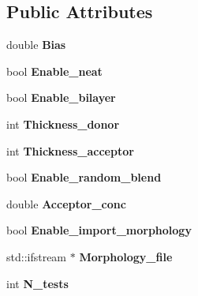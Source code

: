 \subsection*{Public Attributes}
\begin{DoxyCompactItemize}
\item 
\mbox{\label{struct_parameters___o_p_v_ac88bf3fcfbd5dbd502a05709e47d6540}} 
double {\bfseries Bias}
\item 
\mbox{\label{struct_parameters___o_p_v_ab935c4ae52bebea687d925e997fc8218}} 
bool {\bfseries Enable\+\_\+neat}
\item 
\mbox{\label{struct_parameters___o_p_v_a79f3ca42bb1073fac803ff8e74faabc0}} 
bool {\bfseries Enable\+\_\+bilayer}
\item 
\mbox{\label{struct_parameters___o_p_v_a4c49f81e20e235e52f943003f0c14fa3}} 
int {\bfseries Thickness\+\_\+donor}
\item 
\mbox{\label{struct_parameters___o_p_v_afa28203f6b02b27ac415491bf1cb4f8a}} 
int {\bfseries Thickness\+\_\+acceptor}
\item 
\mbox{\label{struct_parameters___o_p_v_a7d9cc030e67893f064dfb45b674f1d0e}} 
bool {\bfseries Enable\+\_\+random\+\_\+blend}
\item 
\mbox{\label{struct_parameters___o_p_v_a21c46734660f2b2a55dbac798f6ea74b}} 
double {\bfseries Acceptor\+\_\+conc}
\item 
\mbox{\label{struct_parameters___o_p_v_aec3dc43adde4450252b30c2c705544cd}} 
bool {\bfseries Enable\+\_\+import\+\_\+morphology}
\item 
\mbox{\label{struct_parameters___o_p_v_a388e0f507abb6742efa33b1ca765ee13}} 
std\+::ifstream $\ast$ {\bfseries Morphology\+\_\+file}
\item 
\mbox{\label{struct_parameters___o_p_v_a502f1711127656c15e78c7f1db168e0f}} 
int {\bfseries N\+\_\+tests}

\end{DoxyCompactItemize}
